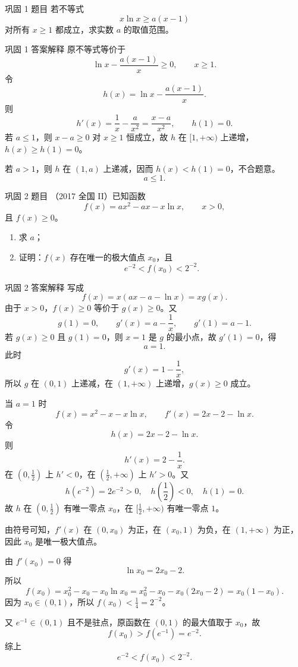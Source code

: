 ﻿\documentclass[aspectratio=169,10pt]{ctexbeamer}
\begin{document}
\begin{frame}{巩固 1 题目}
\small
若不等式
\[
x\ln x\ge a(x-1)
\]
对所有 $x\ge1$ 都成立，求实数 $a$ 的取值范围。
\end{frame}

\begin{frame}[allowframebreaks]{巩固 1 答案解释}
\small
原不等式等价于
\[
\ln x-\frac{a(x-1)}x\ge0,\qquad x\ge1.
\]
令
\[
h(x)=\ln x-\frac{a(x-1)}x.
\]
则
\[
h'(x)=\frac1x-\frac a{x^2}=\frac{x-a}{x^2},\qquad h(1)=0.
\]
若 $a\le1$，则 $x-a\ge0$ 对 $x\ge1$ 恒成立，故 $h$ 在 $[1,+\infty)$ 上递增，$h(x)\ge h(1)=0$。

若 $a>1$，则 $h$ 在 $(1,a)$ 上递减，因而 $h(x)<h(1)=0$，不合题意。
\[
\boxed{a\le1}.
\]
\end{frame}

\begin{frame}{巩固 2 题目}
\small
（2017 全国 II）已知函数
\[
f(x)=ax^2-ax-x\ln x,\qquad x>0,
\]
且 $f(x)\ge0$。
\begin{enumerate}
  \item 求 $a$；
  \item 证明：$f(x)$ 存在唯一的极大值点 $x_0$，且
  \[
  e^{-2}<f(x_0)<2^{-2}.
  \]
\end{enumerate}
\end{frame}

\begin{frame}[allowframebreaks]{巩固 2 答案解释}
\small
写成
\[
f(x)=x(ax-a-\ln x)=xg(x).
\]
由于 $x>0$，$f(x)\ge0$ 等价于 $g(x)\ge0$。又
\[
g(1)=0,\qquad g'(x)=a-\frac1x,\qquad g'(1)=a-1.
\]
若 $g(x)\ge0$ 且 $g(1)=0$，则 $x=1$ 是 $g$ 的最小点，故 $g'(1)=0$，得
\[
\boxed{a=1}.
\]
此时
\[
g'(x)=1-\frac1x,
\]
所以 $g$ 在 $(0,1)$ 上递减，在 $(1,+\infty)$ 上递增，$g(x)\ge0$ 成立。

\framebreak

当 $a=1$ 时
\[
f(x)=x^2-x-x\ln x,\qquad f'(x)=2x-2-\ln x.
\]
令
\[
h(x)=2x-2-\ln x.
\]
则
\[
h'(x)=2-\frac1x.
\]
在 $(0,\frac12)$ 上 $h'<0$，在 $(\frac12,+\infty)$ 上 $h'>0$。又
\[
h(e^{-2})=2e^{-2}>0,\quad h\!\left(\frac12\right)<0,\quad h(1)=0.
\]
故 $h$ 在 $(0,\frac12)$ 有唯一零点 $x_0$，在 $[\frac12,+\infty)$ 有唯一零点 $1$。

\framebreak

由符号可知，$f'(x)$ 在 $(0,x_0)$ 为正，在 $(x_0,1)$ 为负，在 $(1,+\infty)$ 为正，因此 $x_0$ 是唯一极大值点。

由 $f'(x_0)=0$ 得
\[
\ln x_0=2x_0-2.
\]
所以
\[
f(x_0)=x_0^2-x_0-x_0\ln x_0
=x_0^2-x_0-x_0(2x_0-2)
=x_0(1-x_0).
\]
因为 $x_0\in(0,1)$，所以 $f(x_0)<\frac14=2^{-2}$。

又 $e^{-1}\in(0,1)$ 且不是驻点，原函数在 $(0,1)$ 的最大值取于 $x_0$，故
\[
f(x_0)>f(e^{-1})=e^{-2}.
\]
综上
\[
\boxed{e^{-2}<f(x_0)<2^{-2}}.
\]
\end{frame}
\end{document}
